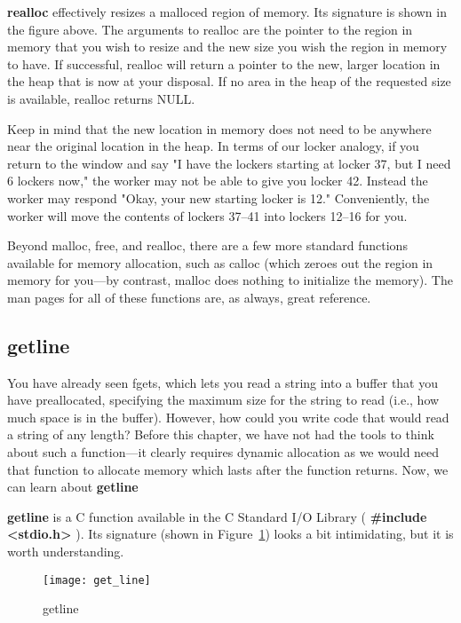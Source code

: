 \documentclass[11pt, a4paper]{article}
\begin{document}
\textbf{realloc} effectively resizes a malloced region of memory. Its signature is shown in the figure above. The arguments to realloc are the pointer to the region in memory that you wish to resize and the new size you wish the region in memory to have. If successful, realloc will return a pointer to the new, larger location in the heap that is now at your disposal. If no area in the heap of the requested size is available, realloc returns NULL.

Keep in mind that the new location in memory does not need to be anywhere near the original location in the heap. In terms of our locker analogy, if you return to the window and say "I have the lockers starting at locker 37, but I need 6 lockers now," the worker may not be able to give you locker 42. Instead the worker may respond "Okay, your new starting locker is 12." Conveniently, the worker will move the contents of lockers 37–41 into lockers 12–16 for you.

Beyond malloc, free, and realloc, there are a few more standard functions available for memory allocation, such as calloc (which zeroes out the region in memory for you—by contrast, malloc does nothing to initialize the memory). The man pages for all of these functions are, as always, great reference.



\subsection{getline}%
\label{sub:getline}



You have already seen fgets, which lets you read a string into a buffer that you have preallocated, specifying the maximum size for the string to read (i.e., how much space is in the buffer). However, how could you write code that would read a string of any length? Before this chapter, we have not had the tools to think about such a function—it clearly requires dynamic allocation as we would need that function to allocate memory which lasts after the function returns. Now, we can learn about \textbf{getline}

\textbf{getline }is a C function available in the C Standard I/O Library ( \textbf{\#include <stdio.h>} ). Its signature (shown in Figure~\ref{fig:get_line}) looks a bit intimidating, but it is worth understanding.


\begin{figure}[htpb]
  \centering
  \texttt{[image: get\_line]}
  \caption{getline}
  \label{fig:get_line}
\end{figure}
\end{document}
